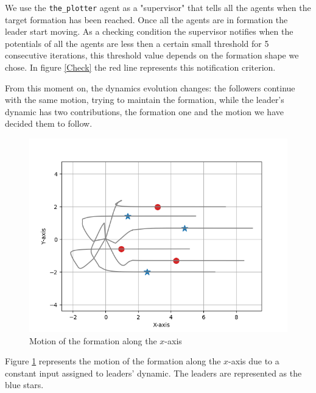 \documentclass[a4paper,11pt,oneside]{book}
\begin{document}
We use the \texttt{the\_plotter} agent as a "supervisor" that tells all the agents when the target formation has been reached. Once all the agents are in formation the leader start moving. As a checking condition the supervisor notifies when the potentials of all the agents are less then a certain small threshold for 5 consecutive iterations, this threshold value depends on the formation shape we chose. In figure \ref{Check} the red line represents this notification criterion.

From this moment on, the dynamics evolution changes: the followers continue with the same motion, trying to maintain the formation, while the leader's dynamic has two contributions, the formation one and the motion we have decided them to follow.

\begin{figure}[h]
\centering
	\includegraphics[scale=0.5]{Moving_hexagon_formation_linear}
	\caption{Motion of the formation along the $x$-axis}
	\label{Formation_motion_lin}
\end{figure}

Figure \ref{Formation_motion_lin} represents the motion of the formation along the $x$-axis due to a constant input assigned to leaders' dynamic. The leaders are represented as the blue stars.
\end{document}
